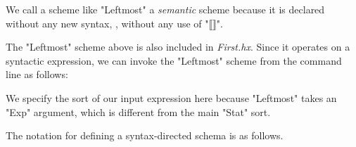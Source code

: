 \documentclass[11pt]{article} %
\begin{document}
We call a scheme like "Leftmost" a \emph{semantic} scheme because it is declared without any new
syntax, \ie, without any use of "⟦⟧".

\begin{commands}
  The "Leftmost" scheme above is also included in \emph{First.hx}.  Since it operates on a syntactic
  expression, we can invoke the "Leftmost" scheme from the command line as follows:
  We specify the sort of our input expression here because "Leftmost" takes an "Exp" argument, which
  is different from the main "Stat" sort.
\end{commands}

The notation for defining a syntax-directed schema is as follows.
\end{document}

